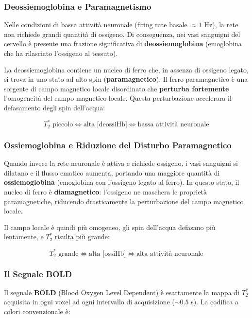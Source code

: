 \subsubsection{Deossiemoglobina e Paramagnetismo}

Nelle condizioni di bassa attività neuronale (firing rate basale $\approx 1$ Hz), la rete non richiede grandi quantità di ossigeno. Di conseguenza, nei vasi sanguigni del cervello è presente una frazione significativa di \textbf{deossiemoglobina} (emoglobina che ha rilasciato l'ossigeno al tessuto).

La deossiemoglobina contiene un nucleo di ferro che, in assenza di ossigeno legato, si trova in uno stato ad alto spin (\textbf{paramagnetico}). Il ferro paramagnetico è una sorgente di campo magnetico locale disordinato che \textbf{perturba fortemente} l'omogeneità del campo magnetico locale. Questa perturbazione accelerara il defasamento degli spin dell'acqua:

$$ T_2^* \text{ piccolo} \Longleftrightarrow \text{alta [deossiHb]} \Longleftrightarrow \text{bassa attività neuronale} $$

\subsubsection{Ossiemoglobina e Riduzione del Disturbo Paramagnetico}

Quando invece la rete neuronale è attiva e richiede ossigeno, i vasi sanguigni si dilatano e il flusso ematico aumenta, portando una maggiore quantità di \textbf{ossiemoglobina} (emoglobina con l'ossigeno legato al ferro). In questo stato, il nucleo di ferro è \textbf{diamagnetico}: l'ossigeno ne maschera le proprietà paramagnetiche, riducendo drasticamente la perturbazione del campo magnetico locale.

Il campo locale è quindi più omogeneo, gli spin dell'acqua defasano più lentamente, e $T_2^*$ risulta più grande:

$$ T_2^* \text{ grande} \Longleftrightarrow \text{alta [ossiHb]} \Longleftrightarrow \text{alta attività neuronale} $$

\subsubsection{Il Segnale BOLD}

Il segnale \textbf{BOLD} (Blood Oxygen Level Dependent) è esattamente la mappa di $T_2^*$ acquisita in ogni voxel ad ogni intervallo di acquisizione ($\sim 0.5$ s). La codifica a colori convenzionale è:


